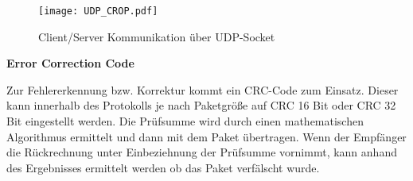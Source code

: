 \begin{figure}[H]
\centering
\texttt{[image: UDP\_CROP.pdf]}
\caption{Client/Server Kommunikation {\"u}ber UDP-Socket}
\label{fig:Socket-Kommunikation}
\end{figure}

\textbf{Error Correction Code}

Zur Fehlererkennung bzw. Korrektur kommt ein CRC-Code zum Einsatz. Dieser kann
innerhalb des Protokolls je nach Paketgr{\"o}{\ss}e auf CRC 16 Bit oder CRC 32
Bit eingestellt werden. Die Pr{\"u}fsumme wird durch einen mathematischen
Algorithmus ermittelt und dann mit dem Paket {\"u}bertragen. Wenn der
Empf{\"a}nger die R{\"u}ckrechnung unter Einbeziehnung der Pr{\"u}fsumme
vornimmt, kann anhand des Ergebnisses ermittelt werden ob das Paket
verf{\"a}lscht wurde. 

